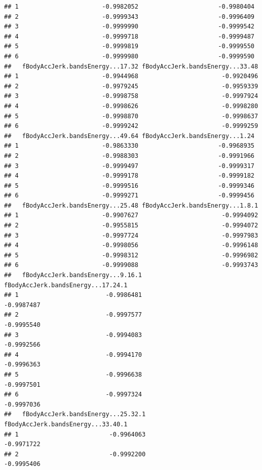 \documentclass[
]{article}
\begin{document}
\begin{verbatim}
## 1                       -0.9982052                      -0.9980404
## 2                       -0.9999343                      -0.9996409
## 3                       -0.9999990                      -0.9999542
## 4                       -0.9999718                      -0.9999487
## 5                       -0.9999819                      -0.9999550
## 6                       -0.9999980                      -0.9999590
##   fBodyAccJerk.bandsEnergy...17.32 fBodyAccJerk.bandsEnergy...33.48
## 1                       -0.9944968                       -0.9920496
## 2                       -0.9979245                       -0.9959339
## 3                       -0.9998758                       -0.9997924
## 4                       -0.9998626                       -0.9998280
## 5                       -0.9998870                       -0.9998637
## 6                       -0.9999242                       -0.9999259
##   fBodyAccJerk.bandsEnergy...49.64 fBodyAccJerk.bandsEnergy...1.24
## 1                       -0.9863330                      -0.9968935
## 2                       -0.9988303                      -0.9991966
## 3                       -0.9999497                      -0.9999317
## 4                       -0.9999178                      -0.9999182
## 5                       -0.9999516                      -0.9999346
## 6                       -0.9999271                      -0.9999456
##   fBodyAccJerk.bandsEnergy...25.48 fBodyAccJerk.bandsEnergy...1.8.1
## 1                       -0.9907627                       -0.9994092
## 2                       -0.9955815                       -0.9994072
## 3                       -0.9997724                       -0.9997983
## 4                       -0.9998056                       -0.9996148
## 5                       -0.9998312                       -0.9996982
## 6                       -0.9999088                       -0.9993743
##   fBodyAccJerk.bandsEnergy...9.16.1 fBodyAccJerk.bandsEnergy...17.24.1
## 1                        -0.9986481                         -0.9987487
## 2                        -0.9997577                         -0.9995540
## 3                        -0.9994083                         -0.9992566
## 4                        -0.9994170                         -0.9996363
## 5                        -0.9996638                         -0.9997501
## 6                        -0.9997324                         -0.9997036
##   fBodyAccJerk.bandsEnergy...25.32.1 fBodyAccJerk.bandsEnergy...33.40.1
## 1                         -0.9964063                         -0.9971722
## 2                         -0.9992200                         -0.9995406

\end{verbatim}
\end{document}
